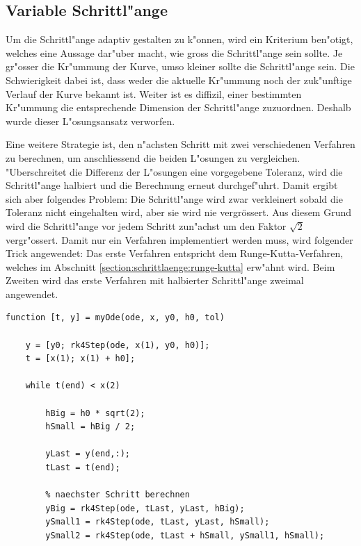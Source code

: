 \begin{refsection}
\section{Variable Schrittl"ange}

Um die Schrittl"ange adaptiv gestalten zu k"onnen, wird ein Kriterium ben"otigt, welches eine Aussage dar"uber macht, wie gross die Schrittl"ange sein sollte.
Je gr"osser die Kr"ummung der Kurve, umso kleiner sollte die Schrittl"ange sein.
Die Schwierigkeit dabei ist, dass weder die aktuelle Kr"ummung noch der zuk"unftige Verlauf der Kurve bekannt ist.
Weiter ist es diffizil, einer bestimmten Kr"ummung die entsprechende Dimension der Schrittl"ange zuzuordnen.
Deshalb wurde dieser L"osungsansatz verworfen.

Eine weitere Strategie ist, den n"achsten Schritt mit zwei verschiedenen Verfahren zu berechnen, um anschliessend die beiden L"osungen zu vergleichen.
"Uberschreitet die Differenz der L"osungen eine vorgegebene Toleranz, wird die Schrittl"ange halbiert und die Berechnung erneut durchgef"uhrt.
Damit ergibt sich aber folgendes Problem: Die Schrittl"ange wird zwar verkleinert sobald die Toleranz nicht eingehalten wird, aber sie wird nie vergrössert.
Aus diesem Grund wird die Schrittl"ange vor jedem Schritt zun"achst um den Faktor $\sqrt{2}$ vergr"ossert. 
Damit nur ein Verfahren implementiert werden muss, wird folgender Trick angewendet: 
Das erste Verfahren entspricht dem Runge-Kutta-Verfahren, welches im Abschnitt \ref{section:schrittlaenge:runge-kutta} erw"ahnt wird.
Beim Zweiten wird das erste Verfahren mit halbierter Schrittl"ange zweimal angewendet. 
\begin{lstlisting}[style=MATLAB, caption=Variable Schrittl"ange, captionpos=b, label=code:myOde] 
function [t, y] = myOde(ode, x, y0, h0, tol)
    
    y = [y0; rk4Step(ode, x(1), y0, h0)]; 
    t = [x(1); x(1) + h0];
    
    while t(end) < x(2)
        
        hBig = h0 * sqrt(2);
        hSmall = hBig / 2;
        
        yLast = y(end,:);
        tLast = t(end);
        
        % naechster Schritt berechnen
        yBig = rk4Step(ode, tLast, yLast, hBig);
        ySmall1 = rk4Step(ode, tLast, yLast, hSmall);
        ySmall2 = rk4Step(ode, tLast + hSmall, ySmall1, hSmall);
        

\end{lstlisting}
\end{refsection}

